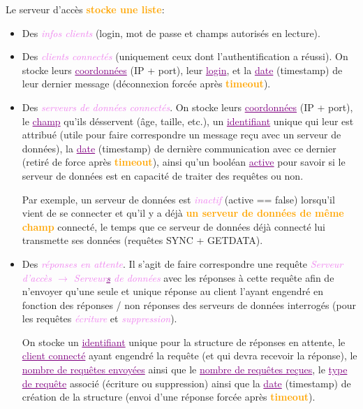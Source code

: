 \documentclass[a4paper]{article}
\newcommand{\ra}{\rightarrow}
\let\oldtextbf\textbf
\renewcommand{\textbf}[1]{\textcolor{orange}{\oldtextbf{#1}}}
\let\oldunderline\underline{}
\renewcommand{\underline}[1]{\textcolor{purple}{\oldunderline{#1}}}
\let\oldtextit\textit
\renewcommand{\textit}[1]{\textcolor{violet}{\oldtextit{#1}}}
\begin{document}
Le serveur d'accès \textbf{stocke une liste}:
\begin{itemize}
    \item Des \textit{infos clients} (login, mot de passe et champs autorisés en lecture).

    \item Des \textit{clients connectés} (uniquement ceux dont l'authentification a réussi). On stocke leurs \underline{coordonnées} (IP + port), leur \underline{login}, et la \underline{date} (timestamp) de leur dernier message (déconnexion forcée après \textbf{timeout}).

    \item Des \textit{serveurs de données connectés}. On stocke leurs \underline{coordonnées} (IP + port), le \underline{champ} qu'ils désservent (âge, taille, etc.), un \underline{identifiant} unique qui leur est attribué (utile pour faire correspondre un message reçu avec un serveur de données), la \underline{date} (timestamp) de dernière communication avec ce dernier (retiré de force après \textbf{timeout}), ainsi qu'un booléan \underline{active} pour savoir si le serveur de données est en capacité de traiter des requêtes ou non.

    Par exemple, un serveur de données est \textit{inactif} (active == false) lorsqu'il vient de se connecter et qu'il y a déjà \textbf{un serveur de données de même champ} connecté, le temps que ce serveur de données déjà connecté lui transmette ses données (requêtes SYNC + GETDATA).

    \item Des \textit{réponses en attente}. Il s'agit de faire correspondre une requête \textit{Serveur d'accès $\ra$ Serveur\underline{s} de données} avec les réponses à cette requête afin de n'envoyer qu'une seule et unique réponse au client l'ayant engendré en fonction des réponses / non réponses des serveurs de données interrogés (pour les requêtes \textit{écriture} et \textit{suppression}).

    On stocke un \underline{identifiant} unique pour la structure de réponses en attente, le \underline{client connecté} ayant engendré la requête (et qui devra recevoir la réponse), le \underline{nombre de requêtes envoyées} ainsi que le \underline{nombre de requêtes reçues}, le \underline{type de requête} associé (écriture ou suppression) ainsi que la \underline{date} (timestamp) de création de la structure (envoi d'une réponse forcée après \textbf{timeout}).
\end{itemize}
\end{document}
